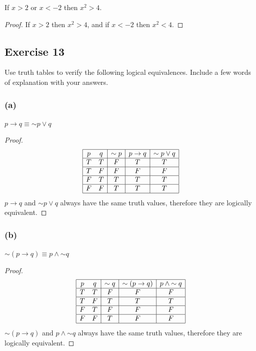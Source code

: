 \documentclass[14pt]{extarticle}
\begin{document}
\begin{center}
If $x > 2$ or $x < -2$ then $x^2 > 4$.
\end{center}

\begin{proof}
If $x > 2$ then $x^2 > 4$, and if $x < -2$ then $x^2 < 4$.
\end{proof}

\subsection{Exercise 13}
Use truth tables to verify the following logical equivalences. Include a few
words of explanation with your answers.

\subsubsection{(a)}
$p \to q \equiv {\sim p} \vee q$

\begin{proof}
$$
\begin{array}{|cc|c|c|c|}
\hline
p & q & {\sim p} & p \to q & {\sim p} \vee q \\
\hline
T & T & F & T & T \\
\hline
T & F & F & F & F \\
\hline
F & T & T & T & T \\
\hline
F & F & T & T & T \\
\hline
\end{array}
$$
$p \to q$ and ${\sim p} \vee q$ always have the same truth values, therefore
they are logically equivalent.
\end{proof}

\subsubsection{(b)}
${\sim (p \to q)} \equiv p \wedge {\sim q}$

\begin{proof}
$$
\begin{array}{|cc|c|c|c|}
\hline
p & q & {\sim q} & {\sim (p \to q)} & p \wedge {\sim q} \\
\hline
T & T & F & F & F \\
\hline
T & F & T & T & T \\
\hline
F & T & F & F & F \\
\hline
F & F & T & F & F \\
\hline
\end{array}
$$
${\sim (p \to q)}$ and $p \wedge {\sim q}$ always have the same truth values,
therefore they are logically equivalent.
\end{proof}
\end{document}
